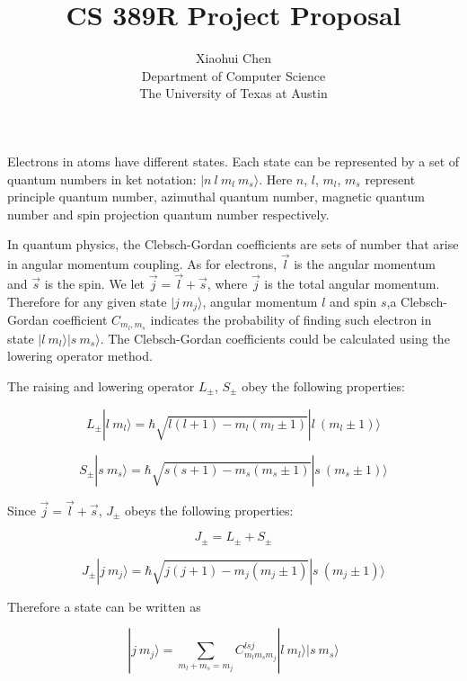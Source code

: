 \documentclass[12pt]{article}
\author{Xiaohui Chen \\Department of Computer Science\\ The University of Texas at Austin }
\title{CS 389R Project Proposal}
\date{\vspace{-5ex}}
\begin{document}
\maketitle

\begin{spacing}{1.0}

Electrons in atoms have different states. Each state can be represented by a set of quantum numbers in ket notation: $|n\ l\ m_l\ m_s \rangle$. Here $n$, $l$, $m_l$, $m_s$ represent principle quantum number, azimuthal quantum number, magnetic quantum number and spin projection quantum number respectively.

In quantum physics, the Clebsch-Gordan coefficients are sets of number that arise in angular momentum coupling. As for electrons, $\vec{l}$ is the angular momentum and $\vec{s}$ is the spin. We let $\vec{j}= \vec{l}+ \vec{s}$, where $\vec{j}$ is the total angular momentum. Therefore for any given state $|j\ m_j \rangle$, angular momentum $l$ and spin $s$,a Clebsch-Gordan coefficient $C_{m_l,m_s}$ indicates the probability of finding such electron in state $|l\ m_l\rangle |s\ m_s\rangle$. The Clebsch-Gordan coefficients could be calculated using the lowering operator method.

The raising and lowering operator $L_{\pm}$, $S_{\pm}$ obey the following properties:

\begin{equation}
L_{\pm} |l\ m_l \rangle = \hbar \sqrt{l(l+1)-m_l(m_l \pm 1)} |l\ (m_l \pm 1) \rangle
\label{l}
\end{equation}


\begin{equation}
S_{\pm} |s\ m_s \rangle = \hbar \sqrt{s(s+1)-m_s(m_s \pm 1)} |s\ (m_s\pm 1) \rangle
\label{s}
\end{equation}

Since $\vec{j}= \vec{l}+ \vec{s}$, $J_{\pm}$ obeys the following properties:

\begin{equation}
J_{\pm}= L_{\pm} + S_{\pm}
\label{jsum}
\end{equation}

\begin{equation}
J_{\pm} |j\ m_j \rangle = \hbar \sqrt{j(j+1)-m_j(m_j \pm 1)} |s\ (m_j \pm 1) \rangle
\label{j}
\end{equation}

Therefore a state can be written as 

\begin{equation}
|j\ m_j \rangle= \sum\limits_{m_l+m_s=m_j} C_{m_l m_s m_j}^{l s j} |l\ m_l \rangle |s\ m_s \rangle \label{sum}
\end{equation}


\end{spacing}
\end{document}
